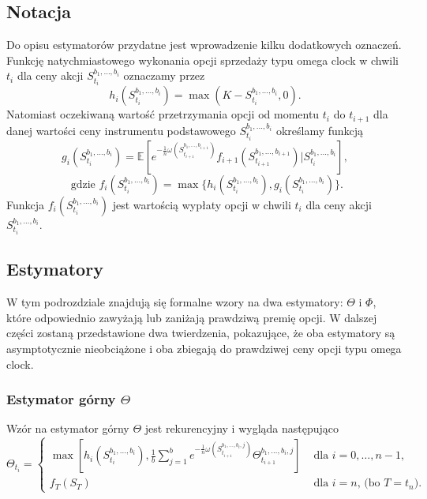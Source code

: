 \documentclass[12pt]{article}
\begin{document}
\subsection{Notacja}
Do opisu estymatorów przydatne jest wprowadzenie kilku dodatkowych oznaczeń.\\
\newline
Funkcję natychmiastowego wykonania opcji sprzedaży typu omega clock w chwili $t_i$ dla ceny akcji $S_{t_i}^{b_1,\ldots,b_i}$ oznaczamy przez
\begin{equation*}
h_i(S_{t_i}^{b_1,\ldots,b_i}) = \max(K-S_{t_i}^{b_1,\ldots,b_i},0).
\end{equation*}
Natomiast oczekiwaną wartość przetrzymania opcji od momentu $t_i$ do $t_{i+1}$ dla danej wartości ceny instrumentu podstawowego $S_{t_i}^{b_1,\ldots,b_i}$ określamy funkcją 
\begin{equation*}
g_i(S_{t_i}^{b_1,\ldots,b_i}) = \mathbb{E}[e^{-\frac{1}{n}\omega(S_{t_{i+1}}^{b_1,\ldots,b_{i+1}})}f_{i+1}(S_{t_{i+1}}^{b_1,\ldots,b_{i+1}})|S_{t_i}^{b_1,\ldots,b_i}],
\end{equation*}
\begin{equation*}
\textrm{ gdzie }f_i(S_{t_i}^{b_1,\ldots,b_i}) = \max\{h_i(S_{t_i}^{b_1,\ldots,b_i}),g_i(S_{t_i}^{b_1,\ldots,b_i})\}.
\end{equation*}
Funkcja $f_i(S_{t_i}^{b_1,\ldots,b_i})$ jest wartością wypłaty opcji w chwili $t_i$ dla ceny akcji $S_{t_i}^{b_1,\ldots,b_i}$.

\subsection{Estymatory}
W tym podrozdziale znajdują się formalne wzory na dwa estymatory: $\Theta$ i $\Phi$, które odpowiednio zawyżają lub zaniżają prawdziwą premię opcji. W dalszej części zostaną przedstawione dwa twierdzenia, pokazujące, że oba estymatory są asymptotycznie nieobciążone i oba zbiegają do prawdziwej ceny opcji typu omega clock.

\subsubsection{Estymator górny $\Theta$}

Wzór na estymator górny $\Theta$ jest rekurencyjny i wygląda następująco
\begin{equation}
\label{eq:gorny}
\Theta_{t_i} = \left\{ \begin{array}{ll}
\max [h_i(S_{t_i}^{b_1,\ldots, b_i}), \frac{1}{b}\sum_{j=1}^b e^{-\frac{1}{n}\omega(S_{t_{i+1}}^{b_1,\ldots,b_i,j})}\Theta_{t_{i+1}}^{b_1,\ldots, b_i,j}] & \textrm{ dla } i=0,\ldots,n-1,\\
 f_{T}(S_{T}) & \textrm{ dla } i=n \textrm{, (bo }T = t_n).
\end{array} \right.
\end{equation}
\end{document}
